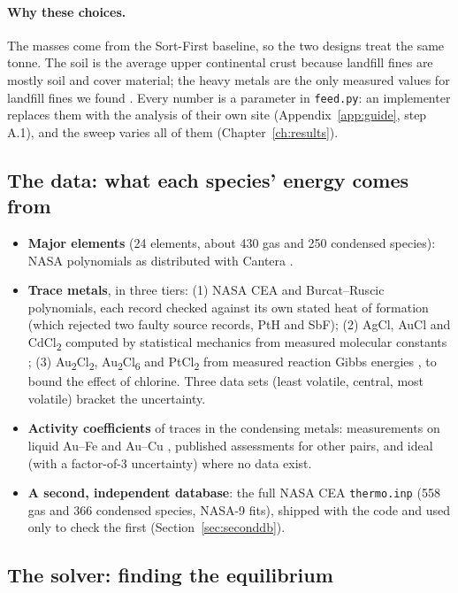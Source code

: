 \documentclass[11pt,a4paper]{article}
\begin{document}
\paragraph{Why these choices.} The masses come from the Sort-First baseline, so the two designs treat the same tonne. The soil is the average upper continental crust because landfill fines are mostly soil and cover material; the heavy metals are the only measured values for landfill fines we found \citep{vollprecht2020}. Every number is a parameter in \texttt{feed.py}: an implementer replaces them with the analysis of their own site (Appendix~\ref{app:guide}, step A.1), and the sweep varies all of them (Chapter~\ref{ch:results}).

\subsection{The data: what each species' energy comes from}
\begin{itemize}
\item \textbf{Major elements} (24 elements, about 430 gas and 250 condensed species): NASA polynomials \citep{mcbride2002} as distributed with Cantera \citep{cantera2023}.
\item \textbf{Trace metals}, in three tiers: (1) NASA CEA and Burcat--Ruscic \citep{burcat2005} polynomials, each record checked against its own stated heat of formation (which rejected two faulty source records, PtH and SbF); (2) AgCl, AuCl and CdCl\textsubscript{2} computed by statistical mechanics from measured molecular constants \citep{huber1979,brown2002}; (3) Au\textsubscript{2}Cl\textsubscript{2}, Au\textsubscript{2}Cl\textsubscript{6} and PtCl\textsubscript{2} from measured reaction Gibbs energies \citep{james1978}, to bound the effect of chlorine. Three data sets (least volatile, central, most volatile) bracket the uncertainty.
\item \textbf{Activity coefficients} of traces in the condensing metals: measurements on liquid Au--Fe \citep{nagamori1968} and Au--Cu \citep{yazawa1975,itagaki1975}, published assessments for other pairs, and ideal (with a factor-of-3 uncertainty) where no data exist.
\item \textbf{A second, independent database}: the full NASA CEA \texttt{thermo.inp} (558 gas and 366 condensed species, NASA-9 fits), shipped with the code and used only to check the first (Section~\ref{sec:seconddb}).
\end{itemize}

\subsection{The solver: finding the equilibrium}
\end{document}
